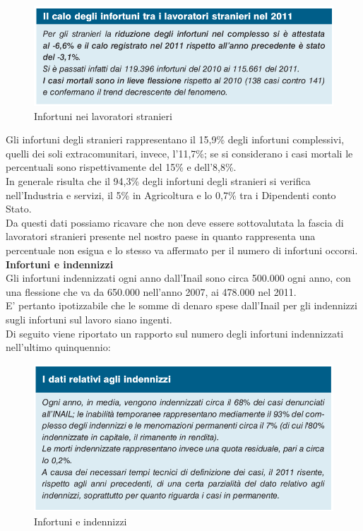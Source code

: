 \begin{figure}[H]
\centering
\includegraphics[scale=0.55]{images/cap4/analisiDiMercato/lavoratoriStranieri2}
\caption{Infortuni nei lavoratori stranieri}
\end{figure}



Gli infortuni degli stranieri rappresentano il 15,9\% degli infortuni complessivi, quelli dei soli extracomunitari, invece, l'11,7\%; se si considerano i casi mortali le percentuali sono rispettivamente del 15\% e dell'8,8\%.\\
In generale risulta che il 94,3\% degli infortuni degli stranieri si verifica nell'Industria e servizi, il 5\% in Agricoltura e lo 0,7\% tra i Dipendenti conto Stato.\\
Da questi dati possiamo ricavare che non deve essere sottovalutata la fascia di lavoratori stranieri presente nel nostro paese in quanto rappresenta una percentuale non esigua e lo stesso va affermato per il numero di infortuni occorsi.\\



\textbf{Infortuni e indennizzi}\\
Gli infortuni indennizzati ogni anno dall'Inail sono circa 500.000 ogni anno, con una flessione che va da 650.000 nell'anno 2007, ai 478.000 nel 2011.\\
E' pertanto ipotizzabile che le somme di denaro spese dall'Inail per gli indennizzi sugli infortuni sul lavoro siano ingenti.\\
Di seguito viene riportato un rapporto sul numero degli infortuni indennizzati nell'ultimo quinquennio:

\begin{figure}[H]
\centering
\includegraphics[scale=0.55]{images/cap4/analisiDiMercato/infortuniIndennizzi1}
\caption{Infortuni e indennizzi}
\end{figure}

